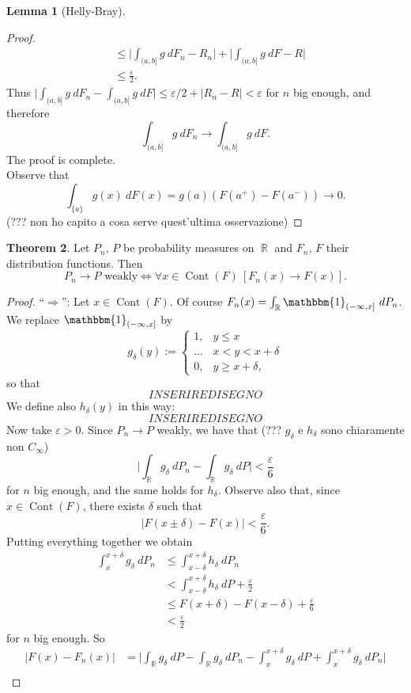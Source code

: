 \documentclass[12pt,a4paper]{report}
\theoremstyle{definition}
\newtheorem{theorem}{Theorem}[chapter] %
\newtheorem{lemma}[theorem]{Lemma}
\theoremstyle{num.custom-title}
\DeclareMathOperator{\R}{\mathbb{R}}
\DeclareMathOperator{\imp}{\Rightarrow}
\DeclareMathOperator{\Cont}{Cont}
\newcommand{\IFF}{\Longleftrightarrow}
\renewcommand{\epsilon}{\varepsilon}
\renewcommand{\1}{\mathbbm{1}}
\begin{document}
\begin{lemma}[Helly-Bray]
\begin{proof}
\begin{align*}
&\leq \Big| \int_{(a,b]} g \ dF_n - R_n \Big| + \Big| \int_{(a,b]} g \ dF - R \Big| \\
&\leq \frac{\epsilon}{2}.
\end{align*}
Thus $\Big| \int_{(a,b]} g \ dF_n - \int_{(a,b]} g \ dF \Big| \leq \epsilon/2 + |R_n - R| < \epsilon$ for $n$ big enough, and therefore
\[
\int_{(a,b]} g \ dF_n \to \int_{(a,b]} g \ dF.
\]
The proof is complete.\\
Observe that
\[
\int_{\{a\}} g(x) \ dF(x) = g(a) (F(a^+)-F(a^-)) \to 0.
\]
(??? non ho capito a cosa serve quest'ultima osservazione)
\end{proof}
\end{lemma}

\begin{theorem}
Let $P_n$, $P$ be probability measures on $\R$ and $F_n$, $F$ their distribution functions. Then
\[
P_n \to P \text{ weakly} \IFF \forall x \in \Cont(F) \ [F_n(x) \to F(x)].
\]
\begin{proof}
``$\imp$'': Let $x \in \Cont(F)$. Of course $F_n(x) = \int_{\R} \1_{(-\infty,x]} \ dP_n$. We replace $\1_{(-\infty,x]}$ by
\[
g_\delta(y) :=
\begin{cases}
1, & y \leq x \\
... & x < y < x+\delta \\
0, & y \geq x+\delta,
\end{cases}
\]
so that
\[
INSERIRE DISEGNO
\]
We define also $h_\delta(y)$ in this way:
\[
INSERIRE DISEGNO
\]
Now take $\epsilon > 0$. Since $P_n \to P$ weakly, we have that (??? $g_\delta$ e $h_\delta$ sono chiaramente non $C_\infty$)
\[
\Big| \int_{\R} g_\delta \ dP_n - \int_{\R} g_\delta \ dP \Big| < \frac{\epsilon}{6}
\]
for $n$ big enough, and the same holds for $h_\delta$. Observe also that, since $x \in \Cont(F)$, there exists $\delta$ such that
\[
|F(x \pm \delta) - F(x)| < \frac{\epsilon}{6}. \tag{$*$}
\]
Putting everything together we obtain
\begin{align*}
\int_x^{x+\delta} g_\delta \ dP_n 
&\leq \int_{x-\delta}^{x+\delta} h_\delta \ dP_n \\
&< \int_{x-\delta}^{x+\delta} h_\delta \ dP + \frac{\epsilon}{2} \\
&\leq F(x+\delta) - F(x-\delta) + \frac{\epsilon}{6} \tag{because $h_\delta \leq 1$} \\
&< \frac{\epsilon}{2} \tag{by $(*)$}
\end{align*}
for $n$ big enough. So
\begin{align*}
|F(x)-F_n(x)| 
&= \Big| \int_{\R} g_\delta \ dP - \int_{\R} g_\delta \ dP_n - \int_x^{x+\delta} g_\delta \ dP + \int_x^{x+\delta} g_\delta \ dP_n \Big| \\

\end{align*}
\end{proof}
\end{theorem}
\end{document}
